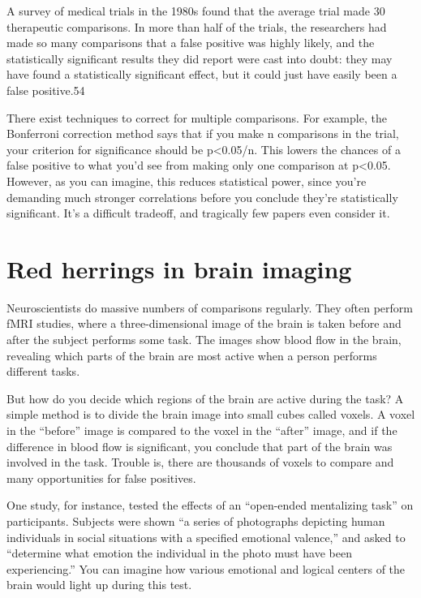 A survey of medical trials in the 1980s found that the average trial made 30 therapeutic comparisons. In more than half of the trials, the researchers had made so many comparisons that a false positive was highly likely, and the statistically significant results they did report were cast into doubt: they may have found a statistically significant effect, but it could just have easily been a false positive.54

There exist techniques to correct for multiple comparisons. For example, the Bonferroni correction method says that if you make n comparisons in the trial, your criterion for significance should be p<0.05/n. This lowers the chances of a false positive to what you’d see from making only one comparison at p<0.05. However, as you can imagine, this reduces statistical power, since you’re demanding much stronger correlations before you conclude they’re statistically significant. It’s a difficult tradeoff, and tragically few papers even consider it.

\section{Red herrings in brain imaging}
\label{chp5:redherrings}

Neuroscientists do massive numbers of comparisons regularly. They often perform fMRI studies, where a three-dimensional image of the brain is taken before and after the subject performs some task. The images show blood flow in the brain, revealing which parts of the brain are most active when a person performs different tasks.

But how do you decide which regions of the brain are active during the task? A simple method is to divide the brain image into small cubes called voxels. A voxel in the “before” image is compared to the voxel in the “after” image, and if the difference in blood flow is significant, you conclude that part of the brain was involved in the task. Trouble is, there are thousands of voxels to compare and many opportunities for false positives.

One study, for instance, tested the effects of an “open-ended mentalizing task” on participants. Subjects were shown “a series of photographs depicting human individuals in social situations with a specified emotional valence,” and asked to “determine what emotion the individual in the photo must have been experiencing.” You can imagine how various emotional and logical centers of the brain would light up during this test.

